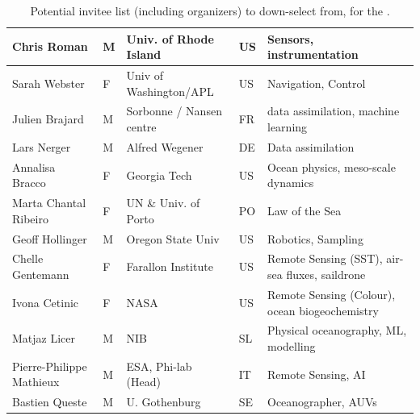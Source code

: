 \begin{table}[H]
{\begin{tabular}{|p{3cm}|p{0.5cm}|p{3.5cm}|p{0.5cm}|p{6cm}|}
\hline
Chris Roman              & M   & Univ. of Rhode Island                 & US       & Sensors, instrumentation                        \\
\hline
Sarah Webster            & F   & Univ of Washington/APL                & US       & Navigation, Control                             \\
\hline
Julien Brajard           & M   & Sorbonne / Nansen centre              & FR       & data assimilation, machine learning             \\
\hline
Lars Nerger              & M   & Alfred Wegener                        & DE       & Data assimilation                               \\
\hline
Annalisa Bracco          & F   & Georgia Tech                          & US       & Ocean physics, meso-scale dynamics              \\
\hline
Marta Chantal Ribeiro    & F   & UN \& Univ. of Porto                  & PO       & Law of the Sea                                  \\
\hline
Geoff Hollinger          & M   & Oregon State Univ                     & US       & Robotics, Sampling                              \\
\hline
Chelle Gentemann         & F   & Farallon Institute                    & US       & Remote Sensing (SST), air-sea fluxes, saildrone \\
\hline
Ivona Cetinic            & F   & NASA                                  & US       & Remote Sensing (Colour), ocean biogeochemistry  \\
\hline
Matjaz Licer             & M   & NIB                                   & SL & Physical oceanography, ML, modelling            \\
\hline
Pierre-Philippe Mathieux & M   & ESA, Phi-lab (Head)                   & IT       & Remote Sensing, AI                              \\
\hline
Bastien Queste           & M   & U. Gothenburg                         & SE       & Oceanographer, AUVs\\                            
\hline
\end{tabular}
}
  \caption{Potential invitee list (including organizers) to down-select from, for the \sympe.}
  \label{tab:part}
\end{table}

